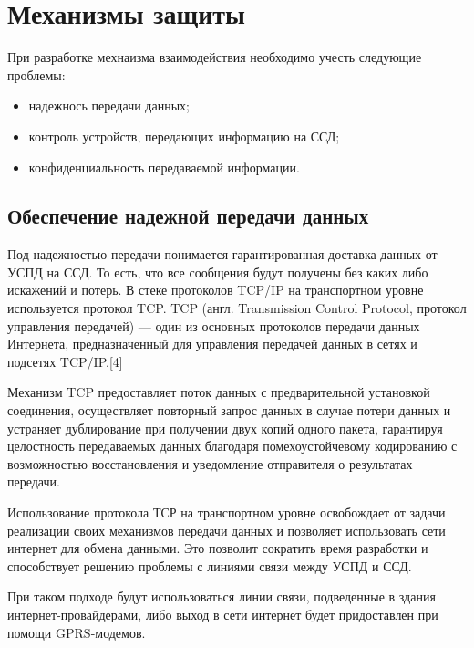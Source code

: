 \newpage
\section{Механизмы защиты}
\setcounter{figure}{0}

При разработке мехнаизма взаимодействия необходимо учесть следующие проблемы:
\begin{itemize}
 \item надежнось передачи данных;
 \item контроль устройств, передающих информацию на ССД;
 \item конфиденциальность передаваемой информации.
\end{itemize}

\subsection{Обеспечение надежной передачи данных} %


Под надежностью передачи понимается гарантированная доставка данных от УСПД на ССД. То есть, что все сообщения будут получены без каких либо искажений и потерь. В стеке протоколов TCP/IP на транспортном уровне используется протокол TCP. TCP (англ. Transmission Control Protocol, протокол управления передачей) — один из основных протоколов передачи данных Интернета, предназначенный для управления передачей данных в сетях и подсетях TCP/IP.[4]

Механизм TCP предоставляет поток данных с предварительной установкой соединения, осуществляет повторный запрос данных в случае потери данных и устраняет дублирование при получении двух копий одного пакета, гарантируя целостность передаваемых данных благодаря помехоустойчевому кодированию с возможностью восстановления и уведомление отправителя о результатах передачи.

Использование протокола ТСР на транспортном уровне освобождает от задачи реализации своих механизмов передачи данных и позволяет использовать сети интернет для обмена данными. Это позволит сократить время разработки и способствует решению проблемы с линиями связи между УСПД и ССД. 

При таком подходе будут использоваться линии связи, подведенные в здания интернет-провайдерами, либо выход в сети интернет будет придоставлен при помощи GPRS-модемов. 

